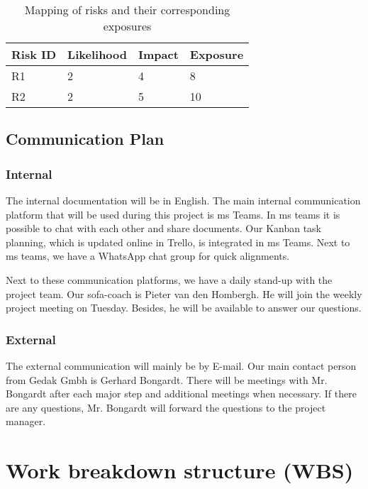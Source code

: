 \begin{table}[htp]
    \caption{Mapping of risks and their corresponding exposures}
    \center
    \begin{tabular}{@{}|l|l|l|l|@{}}
        \toprule
        \textbf{Risk ID} & \textbf{Likelihood} & \textbf{Impact} & \textbf{Exposure} \\
        \hline
        R1      & 2          & 4      & 8        \\
        R2      & 2          & 5      & 10 \\
        \hline
    \end{tabular}\label{tab:table4}
\end{table}

\subsection{Communication Plan}\label{subsec:communication-plan}

\subsubsection{Internal}

The internal documentation will be in English.
The main internal communication platform that will be used during this project is \ac{ms} Teams.
In \ac{ms} teams it is possible to chat with each other and share documents.
Our Kanban task planning, which is updated online in Trello, is integrated in \ac{ms} Teams.
Next to \ac{ms} teams, we have a WhatsApp chat group for quick alignments.

Next to these communication platforms, we have a daily stand-up with the project team.
Our \ac{sofa}-coach is Pieter van den Hombergh.
He will join the weekly project meeting on Tuesday.
Besides, he will be available to answer our questions.

\subsubsection{External}

The external communication will mainly be by E-mail.
Our main contact person from Gedak Gmbh is Gerhard Bongardt.
There will be meetings with Mr. Bongardt after each major step and additional meetings when necessary.
If there are any questions, Mr. Bongardt will forward the questions to the project manager.

\section{Work breakdown structure (WBS)}\label{sec:work-breakdown-structure-(wbs)}


